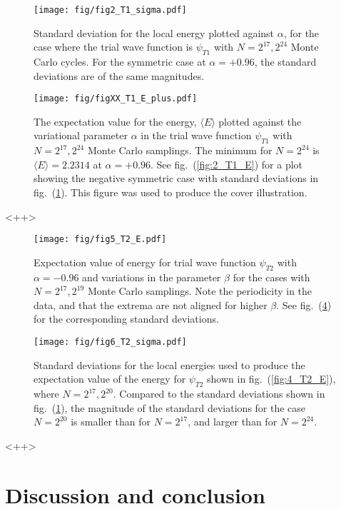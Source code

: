 \documentclass[a4paper,11pt]{article}
\begin{document}
\begin{figure}[htpb]
    \centering
    \texttt{[image: fig/fig2\_T1\_sigma.pdf]}
    \caption{Standard deviation for the local energy plotted against $\alpha$, for the case where the trial wave function is $\psi_{T1}$ with $N=2^{17}, 2^{24}$ Monte Carlo cycles. For the symmetric case at $\alpha = +0.96$, the standard deviations are of the same magnitudes. }
    \label{fig:2_T1_sigma}
\end{figure}

\begin{figure}[htpb]
    \centering
    \texttt{[image: fig/figXX\_T1\_E\_plus.pdf]}
    \caption{The expectation value for the energy, $\langle E \rangle$ plotted against the variational parameter $\alpha$ in the trial wave function $\psi_{T1}$ with $N=2^{17}, 2^{24}$ Monte Carlo samplings. The minimum for $N=2^{24}$ is $\langle E \rangle = 2.2314$ at $\alpha=+0.96$. See fig.~(\ref{fig:2_T1_E}) for a plot showing the negative symmetric case with standard deviations in fig.~(\ref{fig:2_T1_sigma}). This figure was used to produce the cover illustration. }
    \label{fig:XX_T1_E_plus}
\end{figure}<++>

\begin{figure}[htpb]
    \centering
    \texttt{[image: fig/fig5\_T2\_E.pdf]}
    \caption{Expectation value of energy for trial wave function $\psi_{T2}$ with $\alpha = -0.96$ and variations in the parameter $\beta$ for the cases with $N=2^{17}, 2^{19}$ Monte Carlo samplings. Note the periodicity in the data, and that the extrema are not aligned for higher $\beta$. See fig.~(\ref{fig:6_T2_sigma}) for the corresponding standard deviations.}
    \label{fig:5_T2_E}
\end{figure}

\begin{figure}[htpb]
    \centering
    \texttt{[image: fig/fig6\_T2\_sigma.pdf]}
    \caption{Standard deviations for the local energies used to produce the expectation value of the energy for $\psi_{T2}$ shown in fig.~(\ref{fig:4_T2_E}), where $N=2^{17}, 2^{20}$. Compared to the standard deviations shown in fig.~(\ref{fig:2_T1_sigma}), the magnitude of the standard deviations for the case $N=2^{20}$ is smaller than for $N=2^{17}$, and larger than for $N=2^{24}$. }
    \label{fig:6_T2_sigma}
\end{figure}<++>

\section{Discussion and conclusion}





\end{document}
